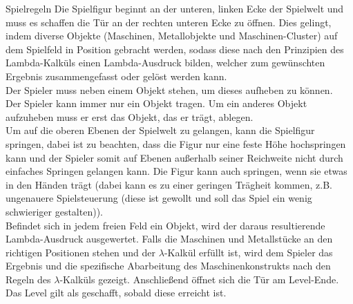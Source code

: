 \documentclass{scrartcl}
\begin{document}
\begin{description}

\begin{minipage}{1\textwidth}
	\item[Spielregeln] \label{spielaufbau:Spielregeln} 
	Die Spielfigur beginnt an der unteren, linken Ecke der Spielwelt und muss es schaffen die Tür an der rechten unteren Ecke zu öffnen. Dies gelingt, indem diverse Objekte (Maschinen, Metallobjekte und Maschinen-Cluster) auf dem Spielfeld in Position gebracht werden, sodass diese nach den Prinzipien des Lambda-Kalküls einen Lambda-Ausdruck bilden, welcher zum gewünschten Ergebnis zusammengefasst oder gelöst werden kann.\\
	Der Spieler muss neben einem Objekt stehen, um dieses aufheben zu können.\\
	Der Spieler kann immer nur ein Objekt tragen. Um ein anderes Objekt aufzuheben muss er erst das Objekt, das er trägt, ablegen.\\
	Um auf die oberen Ebenen der Spielwelt zu gelangen, kann die Spielfigur springen, dabei ist zu beachten, dass die Figur nur eine feste Höhe hochspringen kann und der Spieler somit auf Ebenen außerhalb seiner Reichweite nicht durch einfaches Springen gelangen kann. Die Figur kann auch springen, wenn sie etwas in den Händen trägt (dabei kann es zu einer geringen Trägheit kommen, z.B. ungenauere Spielsteuerung (diese ist gewollt und soll das Spiel ein wenig schwieriger gestalten)).\\
	Befindet sich in jedem freien Feld ein Objekt, wird der daraus resultierende Lambda-Ausdruck ausgewertet. Falls die Maschinen und Metallstücke an den richtigen Positionen stehen und der $\lambda$-Kalkül erfüllt ist, wird dem Spieler das Ergebnis und die spezifische Abarbeitung des Maschinenkonstrukts nach den Regeln des $\lambda$-Kalküls gezeigt. Anschließend öffnet sich die Tür am Level-Ende. Das Level gilt als geschafft, sobald diese erreicht ist.\\
	
\end{minipage}


\end{description}
\end{document}

